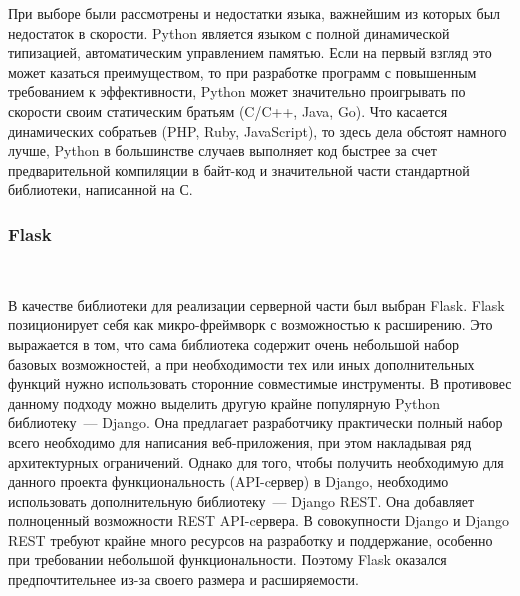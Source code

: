 При выборе были рассмотрены и недостатки языка, важнейшим из которых был недостаток в скорости. Python является языком с полной динамической типизацией, автоматическим  управлением памятью. Если на первый взгляд это может казаться преимуществом, то при разработке программ с повышенным требованием к эффективности, Python может значительно  проигрывать по скорости своим статическим братьям (C/C++, Java, Go). Что касается динамических собратьев (PHP, Ruby, JavaScript), то здесь дела обстоят намного лучше, Python в  большинстве случаев выполняет код быстрее за счет предварительной компиляции в байт-код и значительной части стандартной библиотеки, написанной на С.
 
\subsubsection{Flask}~\par
В качестве библиотеки для реализации серверной части был выбран Flask. 
Flask позиционирует себя как микро-фреймворк с возможностью к расширению.
Это выражается в том, что сама библиотека содержит очень небольшой набор базовых возможностей, а при необходимости тех или иных дополнительных функций нужно использовать сторонние совместимые инструменты. 
В противовес данному подходу можно выделить другую крайне популярную Python библиотеку~--- Django.
Она предлагает разработчику практически полный набор всего необходимо для написания веб-приложения, при этом накладывая ряд архитектурных ограничений.
Однако для того, чтобы получить необходимую для данного проекта функциональность (API-cервер) в Django, необходимо использовать дополнительную библиотеку~--- Django REST.
Она добавляет полноценный возможности REST API-cервера.
В совокупности Django и Django REST требуют крайне много ресурсов на разработку и поддержание, особенно при требовании небольшой функциональности. 
Поэтому Flask оказался предпочтительнее из-за своего размера и расширяемости.
